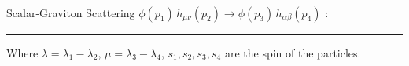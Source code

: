 \documentclass[aspectratio=169,usenames,dvipsnames]{beamer}
\begin{document}
\begin{frame}{\centering {}\\
    \small Scalar-Graviton Scattering  $\phi(p_1)\, h_{\mu\nu}(p_2)
    \rightarrow \phi(p_3)\, h_{\alpha\beta} (p_4)$ :}
\begin{tcolorbox}[enhanced,width=\textwidth,colframe=LUCopper,arc=4pt,boxrule=1pt,drop
  fuzzy shadow]
\end{tcolorbox}
\vspace{.2mm}
\textcolor{LUCopper}{\rule{\textwidth}{1pt}}
\raggedright\tiny Where $\lambda =\lambda_1-\lambda_2$,\;  $\mu=\lambda_3-\lambda_4
    $,\; $s_1,s_2,s_3,s_4$ are the spin of the particles.
\vspace{100mm}
\end{frame}
\end{document}

